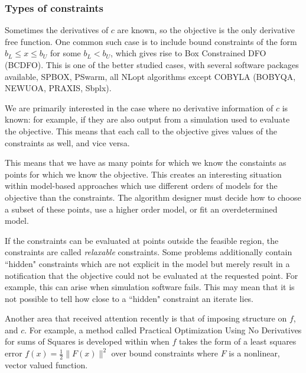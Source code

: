 \documentclass{article}
\begin{document}
\subsubsection{Types of constraints}

Sometimes the derivatives of $c$ are known, so the objective is the only derivative free function.
One common such case is to include bound constraints of the form $b_{L} \le x \le b_{U}$ for some $b_{L} < b_{U}$, which gives rise to Box Constrained DFO (BCDFO).
This is one of the better studied cases, with several software packages available, SPBOX, PSwarm, all NLopt algorithms except COBYLA (BOBYQA, NEWUOA, PRAXIS, Sbplx).


We are primarily interested in the case where no derivative information of $c$ is known: for example, if they are also output from a simulation used to evaluate the objective.
This means that each call to the objective gives values of the constraints as well, and vice versa.

This means that we have as many points for which we know the constaints as points for which we know the objective.
This creates an interesting situation within model-based approaches which use different orders of models for the objective than the constraints.
The algorithm designer must decide how to choose a subset of these points, use a higher order model, or fit an overdetermined model.

If the constraints can be evaluated at points outside the feasible region, the constraints are called \emph{relaxable} constraints.
Some problems additionally contain ``hidden" constraints which are not explicit in the model but merely result in a notification that the objective could not be evaluated at the requested point.
For example, this can arise when simulation software fails.
This may mean that it is not possible to tell how close to a ``hidden" constraint an iterate lies.


Another area that received attention recently is that of imposing structure on $f$, and $c$.
For example, a method called Practical Optimization Using No Derivatives for sums of Squares
is developed within \cite{DUMMY:leastsquares} when $f$ takes the form of a least squares error
$f(x) = \frac 1 2 \|F(x)\|^2$ over bound constraints where $F$ is a nonlinear, vector valued function.

\end{document}
